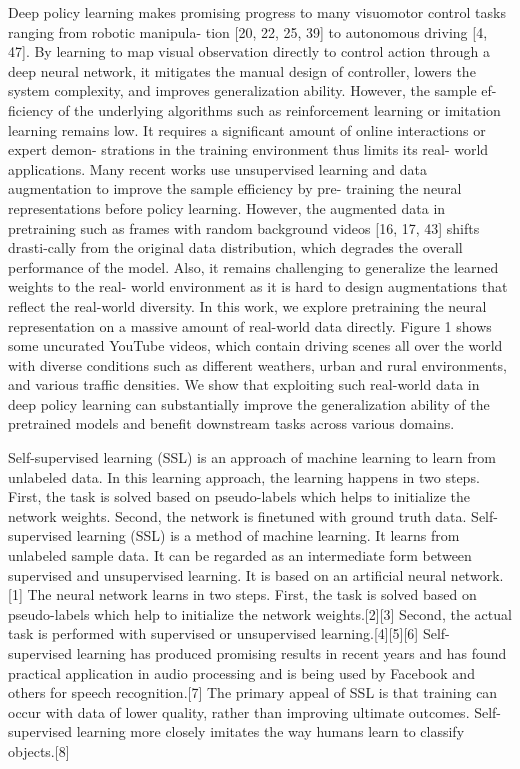 \documentclass[letterpaper, 12pt]{article}
\theoremstyle{definition}
\theoremstyle{definition}
\theoremstyle{definition}
\theoremstyle{definition}
\theoremstyle{definition}
\begin{document}
Deep policy learning makes promising progress to many visuomotor control tasks
ranging from robotic manipula- tion [20, 22, 25, 39] to autonomous driving [4,
47]. By learning to map visual observation directly to control action through a
deep neural network, it mitigates the manual design of controller, lowers the
system complexity, and improves generalization ability. However, the sample ef-
ficiency of the underlying algorithms such as reinforcement learning or
imitation learning remains low. It requires a significant amount of online
interactions or expert demon- strations in the training environment thus limits
its real- world applications.  Many recent works use unsupervised learning and
data augmentation to improve the sample efficiency by pre- training the neural
representations before policy learning.  However, the augmented data in
pretraining such as frames with random background videos [16, 17, 43] shifts
drasti-cally from the original data distribution, which degrades the overall
performance of the model. Also, it remains challenging to generalize the learned
weights to the real- world environment as it is hard to design augmentations
that reflect the real-world diversity. In this work, we explore pretraining the
neural representation on a massive amount of real-world data directly. Figure 1
shows some uncurated YouTube videos, which contain driving scenes all over the
world with diverse conditions such as different weathers, urban and rural
environments, and various traffic densities.  We show that exploiting such
real-world data in deep policy learning can substantially improve the
generalization ability of the pretrained models and benefit downstream tasks
across various domains.


Self-supervised learning (SSL) is an approach of machine learning to learn from
unlabeled data. In this learning approach, the learning happens in two
steps. First, the task is solved based on pseudo-labels which helps to
initialize the network weights. Second, the network is finetuned with ground
truth data.
Self-supervised learning (SSL) is a method of machine learning. It learns from unlabeled sample data. It can be regarded as an intermediate form between supervised and unsupervised learning. It is based on an artificial neural network.[1] The neural network learns in two steps. First, the task is solved based on pseudo-labels which help to initialize the network weights.[2][3] Second, the actual task is performed with supervised or unsupervised learning.[4][5][6] Self-supervised learning has produced promising results in recent years and has found practical application in audio processing and is being used by Facebook and others for speech recognition.[7] The primary appeal of SSL is that training can occur with data of lower quality, rather than improving ultimate outcomes. Self-supervised learning more closely imitates the way humans learn to classify objects.[8]
\end{document}
